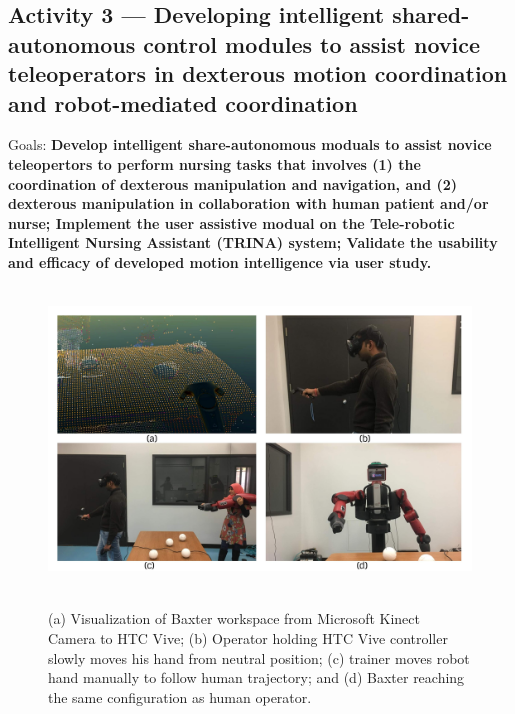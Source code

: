 \documentclass[letterpaper, 11 pt, onecolumn]{article}
\begin{document}

\subsection{Activity 3 --- Developing intelligent shared-autonomous control modules to assist novice teleoperators in dexterous motion coordination and robot-mediated coordination}\label{sec:plan-evaluation}
\noindent
Goals: \textbf{Develop intelligent share-autonomous moduals to assist novice teleopertors to perform nursing tasks that involves (1) the coordination of dexterous manipulation and navigation, and (2) dexterous manipulation in collaboration with human patient and/or nurse; Implement the user assistive modual on the Tele-robotic Intelligent Nursing Assistant (TRINA) system; Validate the usability and efficacy of developed motion intelligence via user study. }

\begin{figure}
\centering
\vspace{-1mm}
  \mbox{
  \includegraphics[width=1.0\linewidth]{fig//vive-baxter.jpg}
  }
\caption{(a) Visualization of Baxter workspace from Microsoft Kinect Camera to HTC Vive; (b) Operator holding HTC Vive controller slowly moves his hand from neutral position; (c) trainer moves robot hand manually to follow human trajectory; and (d) Baxter reaching the same configuration as human operator.}
\label{fig:vive}
\end{figure}
\end{document}
